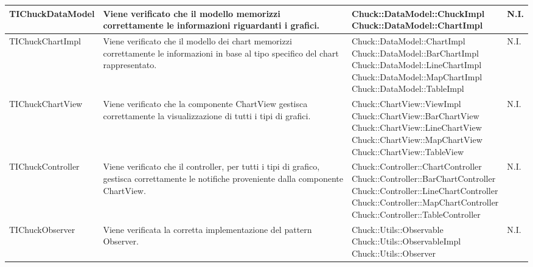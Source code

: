 \begin{longtabu}{| X | X | X | X[0.5] |}
	TIChuckDataModel
				&
Viene verificato che il modello memorizzi correttamente le informazioni riguardanti i grafici.
			& \parbox[t]{0.6\textwidth}{
Chuck::DataModel::ChuckImpl\\
Chuck::DataModel::ChartImpl}
			& N.I.
			\\ \hline



	TIChuckChartImpl
				&
Viene verificato che il modello dei chart memorizzi correttamente le informazioni in base al tipo specifico del chart rappresentato.
			& \parbox[t]{0.6\textwidth}{
Chuck::DataModel::ChartImpl\\
Chuck::DataModel::BarChartImpl\\
Chuck::DataModel::LineChartImpl\\
Chuck::DataModel::MapChartImpl\\
Chuck::DataModel::TableImpl}
			& N.I.
			\\ \hline



	TIChuckChartView
				&
Viene verificato che la componente ChartView gestisca correttamente la visualizzazione di tutti i tipi di grafici.
			& \parbox[t]{0.6\textwidth}{
Chuck::ChartView::ViewImpl\\
Chuck::ChartView::BarChartView\\
Chuck::ChartView::LineChartView\\
Chuck::ChartView::MapChartView\\
Chuck::ChartView::TableView}
			& N.I.
			\\ \hline



	TIChuckController
				&
Viene verificato che il controller, per tutti i tipi di grafico, gestisca correttamente le notifiche proveniente dalla componente ChartView.
			& \parbox[t]{0.6\textwidth}{
Chuck::Controller::ChartController\\
Chuck::Controller::BarChartController\\
Chuck::Controller::LineChartController\\
Chuck::Controller::MapChartController\\
Chuck::Controller::TableController}
			& N.I.
			\\ \hline



	TIChuckObserver &
Viene verificata la corretta implementazione del pattern Observer.
			& \parbox[t]{0.6\textwidth}{
Chuck::Utils::Observable\\
Chuck::Utils::ObservableImpl\\
Chuck::Utils::Observer}
			& N.I.
			\\ \hline










\end{longtabu}
